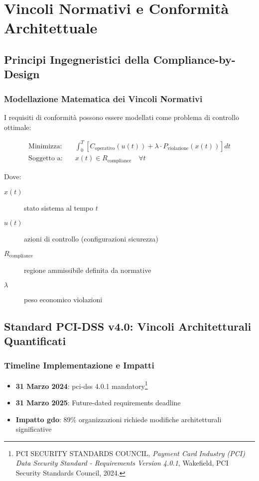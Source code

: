 \section{Vincoli Normativi e Conformità Architettuale}
\label{sec:vincoli-normativi}

\subsection{Principi Ingegneristici della Compliance-by-Design}
\label{subsec:principi-compliance-by-design}

\subsubsection{Modellazione Matematica dei Vincoli Normativi}

I requisiti di conformità possono essere modellati come problema di controllo ottimale:

\begin{align}
\text{Minimizza:} \quad & \int_0^T [C_{\text{operativo}}(u(t)) + \lambda \cdot P_{\text{violazione}}(x(t))] dt \label{eq:controllo-ottimale-obj} \\
\text{Soggetto a:} \quad & x(t) \in R_{\text{compliance}} \quad \forall t \nonumber
\end{align}

Dove:
\begin{description}
    \item[$x(t)$] stato sistema al tempo $t$
    \item[$u(t)$] azioni di controllo (configurazioni sicurezza)
    \item[$R_{\text{compliance}}$] regione ammissibile definita da normative
    \item[$\lambda$] peso economico violazioni
\end{description}

\subsection{Standard PCI-DSS v4.0: Vincoli Architetturali Quantificati}
\label{subsec:pci-dss-vincoli}

\subsubsection{Timeline Implementazione e Impatti}

\begin{itemize}
    \item \textbf{31 Marzo 2024}: \gls{pci-dss} 4.0.1 mandatory\footnote{PCI SECURITY STANDARDS COUNCIL, \textit{Payment Card Industry (PCI) Data Security Standard - Requirements Version 4.0.1}, Wakefield, PCI Security Standards Council, 2024.}
    \item \textbf{31 Marzo 2025}: Future-dated requirements deadline
    \item \textbf{Impatto \gls{gdo}}: 89\% organizzazioni richiede modifiche architetturali significative
\end{itemize}

